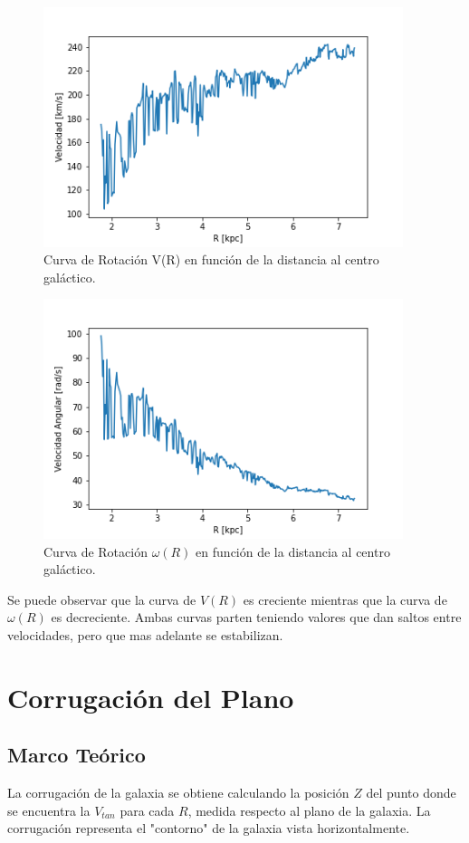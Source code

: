 \documentclass[letterpaper,oneside]{article}
\begin{document}
\begin{figure}
  \centering
  \includegraphics[height=7cm]{../graficos/curvavr.png}
  \caption{Curva de Rotación V(R) en función de la distancia al centro galáctico.}
\end{figure}

\begin{figure}
  \centering
  \includegraphics[height=7cm]{../graficos/curvaomegar.png}
  \caption{Curva de Rotación $\omega(R)$ en función de la distancia al centro galáctico.}
\end{figure}

Se puede observar que la curva de $V(R)$ es creciente mientras que la curva de $\omega (R)$ es decreciente. Ambas curvas parten teniendo valores que dan saltos entre velocidades, pero que mas adelante se estabilizan. 

\section{Corrugación del Plano}
\subsection{Marco Teórico}
La corrugación de la galaxia se obtiene calculando la posición $Z$ del punto donde se encuentra la $V_{tan}$ para cada $R$, medida respecto al plano de la galaxia. La corrugación representa el "contorno" de la galaxia vista horizontalmente.
\end{document}

